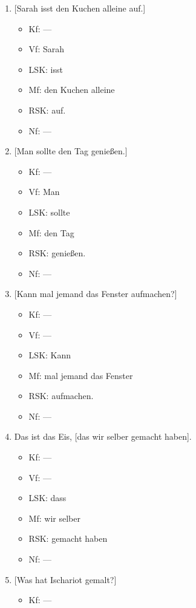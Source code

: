\begin{enumerate}\Lf
  \item{} [Sarah isst den Kuchen alleine auf.]
    \begin{itemize}\Lf
      \item Kf: ---
      \item Vf: Sarah
      \item LSK: isst
      \item Mf: den Kuchen alleine
      \item RSK: auf.
      \item Nf: ---
    \end{itemize}
  \item{} [Man sollte den Tag genießen.]
    \begin{itemize}\Lf
      \item Kf: ---
      \item Vf: Man
      \item LSK: sollte
      \item Mf: den Tag
      \item RSK: genießen.
      \item Nf: ---
    \end{itemize}
  \item{} [Kann mal jemand das Fenster aufmachen?]
    \begin{itemize}\Lf
      \item Kf: ---
      \item Vf: ---
      \item LSK: Kann
      \item Mf: mal jemand das Fenster
      \item RSK: aufmachen.
      \item Nf: ---
    \end{itemize}
  \item Das ist das Eis, [das wir selber gemacht haben].
    \begin{itemize}\Lf
      \item Kf: ---
      \item Vf: ---
      \item LSK: dass
      \item Mf: wir selber
      \item RSK: gemacht haben
      \item Nf: ---
    \end{itemize}
  \item{} [Was hat Ischariot gemalt?]
    \begin{itemize}\Lf
      \item Kf: ---

\end{itemize}
\end{enumerate}
